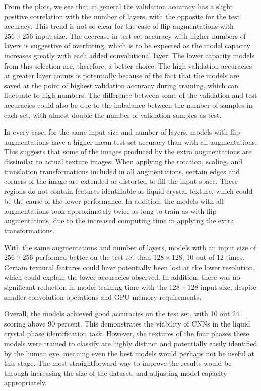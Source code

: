 \documentclass[12pt]{article}
\begin{document}
From the plots, we see that in general the validation accuracy has a slight positive correlation with the number of layers, with the opposite for the test accuracy. This trend is not so clear for the case of flip augmentations with $256 \times 256$ input size. The decrease in test set accuracy with higher numbers of layers is suggestive of overfitting, which is to be expected as the model capacity increases greatly with each added convolutional layer. The lower capacity models from this selection are, therefore, a better choice. The high validation accuracies at greater layer counts is potentially because of the fact that the models are saved at the point of highest validation accuracy during training, which can fluctuate to high numbers. The difference between some of the validation and test accuracies could also be due to the imbalance between the number of samples in each set, with almost double the number of validation samples as test.

In every case, for the same input size and number of layers, models with flip augmentations have a higher mean test set accuracy than with all augmentations. This suggests that some of the images produced by the extra augmentations are dissimilar to actual texture images. When applying the rotation, scaling, and translation transformations included in all augmentations, certain edges and corners of the image are extended or distorted to fill the input space. These regions do not contain features identifiable as liquid crystal texture, which could be the cause of the lower performance. In addition, the models with all augmentations took approximately twice as long to train as with flip augmentations, due to the increased computing time in applying the extra transformations.

With the same augmentations and number of layers, models with an input size of $256 \times 256$ performed better on the test set than $128 \times 128$, 10 out of 12 times. Certain textural features could have potentially been lost at the lower resolution, which could explain the lower accuracies observed. In addition, there was no significant reduction in model training time with the $128 \times 128$ input size, despite smaller convolution operations and GPU memory requirements.

Overall, the models achieved good accuracies on the test set, with 10 out 24 scoring above 90 percent. This demonstrates the viability of CNNs in the liquid crystal phase identification task. However, the textures of the four phases these models were trained to classify are highly distinct and potentially easily identified by the human eye, meaning even the best models would perhaps not be useful at this stage. The most straightforward way to improve the results would be through increasing the size of the dataset, and adjusting model capacity appropriately.
\end{document}
